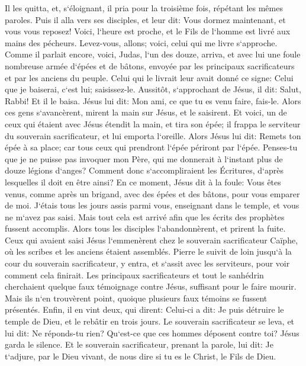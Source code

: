 \verse Il les quitta, et, s`éloignant, il pria pour la troisième fois, répétant les mêmes paroles. 
\verse Puis il alla vers ses disciples, et leur dit: Vous dormez maintenant, et vous vous reposez! Voici, l`heure est proche, et le Fils de l`homme est livré aux mains des pécheurs. 
\verse Levez-vous, allons; voici, celui qui me livre s`approche. 
\verse Comme il parlait encore, voici, Judas, l`un des douze, arriva, et avec lui une foule nombreuse armée d`épées et de bâtons, envoyée par les principaux sacrificateurs et par les anciens du peuple. 
\verse Celui qui le livrait leur avait donné ce signe: Celui que je baiserai, c`est lui; saisissez-le. 
\verse Aussitôt, s`approchant de Jésus, il dit: Salut, Rabbi! Et il le baisa. 
\verse Jésus lui dit: Mon ami, ce que tu es venu faire, fais-le. Alors ces gens s`avancèrent, mirent la main sur Jésus, et le saisirent. 
\verse Et voici, un de ceux qui étaient avec Jésus étendit la main, et tira son épée; il frappa le serviteur du souverain sacrificateur, et lui emporta l`oreille. 
\verse Alors Jésus lui dit: Remets ton épée à sa place; car tous ceux qui prendront l`épée périront par l`épée. 
\verse Penses-tu que je ne puisse pas invoquer mon Père, qui me donnerait à l`instant plus de douze légions d`anges? 
\verse Comment donc s`accompliraient les Écritures, d`après lesquelles il doit en être ainsi? 
\verse En ce moment, Jésus dit à la foule: Vous êtes venus, comme après un brigand, avec des épées et des bâtons, pour vous emparer de moi. J`étais tous les jours assis parmi vous, enseignant dans le temple, et vous ne m`avez pas saisi. 
\verse Mais tout cela est arrivé afin que les écrits des prophètes fussent accomplis. Alors tous les disciples l`abandonnèrent, et prirent la fuite. 
\verse Ceux qui avaient saisi Jésus l`emmenèrent chez le souverain sacrificateur Caïphe, où les scribes et les anciens étaient assemblés. 
\verse Pierre le suivit de loin jusqu`à la cour du souverain sacrificateur, y entra, et s`assit avec les serviteurs, pour voir comment cela finirait. 
\verse Les principaux sacrificateurs et tout le sanhédrin cherchaient quelque faux témoignage contre Jésus, suffisant pour le faire mourir. 
\verse Mais ils n`en trouvèrent point, quoique plusieurs faux témoins se fussent présentés. Enfin, il en vint deux, qui dirent: 
\verse Celui-ci a dit: Je puis détruire le temple de Dieu, et le rebâtir en trois jours. 
\verse Le souverain sacrificateur se leva, et lui dit: Ne réponds-tu rien? Qu`est-ce que ces hommes déposent contre toi? 
\verse Jésus garda le silence. Et le souverain sacrificateur, prenant la parole, lui dit: Je t`adjure, par le Dieu vivant, de nous dire si tu es le Christ, le Fils de Dieu. 
